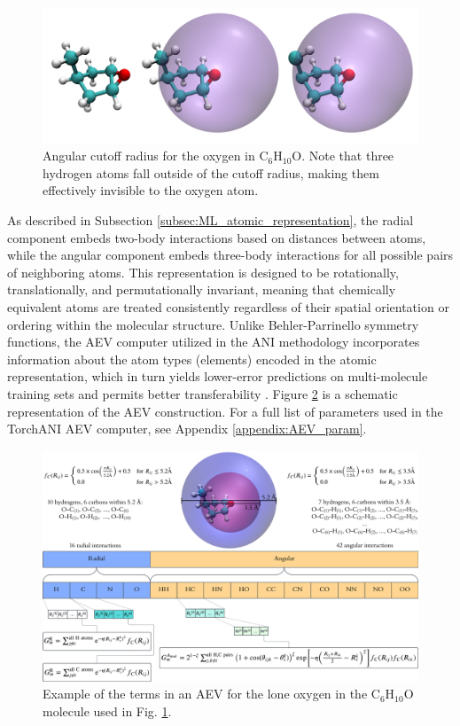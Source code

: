 \begin{figure}[h!]
    \centering
    \includegraphics[width=1\linewidth]{Images/aev_radius/aev_radius_combined.png}
    \caption[Demonstration of AEV angular cutoff radius.]{Angular cutoff radius for the oxygen in C$_6$H$_{10}$O. Note that three hydrogen atoms fall outside of the cutoff radius, making them effectively invisible to the oxygen atom.}
    \label{fig:aev_radius}
\end{figure}

As described in Subsection \ref{subsec:ML_atomic_representation}, the radial component embeds two-body interactions based on distances between atoms, while the angular component embeds three-body interactions for all possible pairs of neighboring atoms.
This representation is designed to be rotationally, translationally, and permutationally invariant, meaning that chemically equivalent atoms are treated consistently regardless of their spatial orientation or ordering within the molecular structure.
Unlike Behler-Parrinello symmetry functions, the AEV computer utilized in the ANI methodology incorporates information about the atom types (elements) encoded in the atomic representation, which in turn yields lower-error predictions on multi-molecule training sets and permits better transferability \cite{ani-1}.
Figure \ref{fig:aev_construction} is a schematic representation of the AEV construction. 
For a full list of parameters used in the TorchANI AEV computer, see Appendix \ref{appendix:AEV_param}.

\begin{figure}[hb]
    \centering
    \includegraphics[width=1\linewidth]{Images/aev_radius/AEV_construction.png}
    \caption{Example of the terms in an AEV for the lone oxygen in the C$_6$H$_{10}$O molecule used in Fig. \ref{fig:aev_radius}. }
    \label{fig:aev_construction}
\end{figure}

